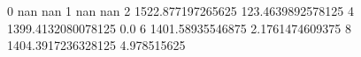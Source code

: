 0 nan nan
1 nan nan
2 1522.877197265625 123.4639892578125
4 1399.4132080078125 0.0
6 1401.58935546875 2.1761474609375
8 1404.3917236328125 4.978515625
